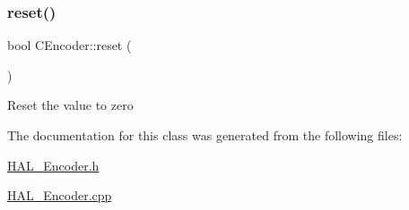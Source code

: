 \mbox{\label{class_c_encoder_a75c1bf0e999ea2c93937e487ab89f4a8}} 
\subsubsection{\texorpdfstring{reset()}{reset()}}
{\footnotesize\ttfamily bool C\+Encoder\+::reset (\begin{DoxyParamCaption}{ }\end{DoxyParamCaption})}

Reset the value to zero 

The documentation for this class was generated from the following files\+:\begin{DoxyCompactItemize}
\item 
\mbox{\hyperlink{_h_a_l___encoder_8h}{H\+A\+L\+\_\+\+Encoder.\+h}}\item 
\mbox{\hyperlink{_h_a_l___encoder_8cpp}{H\+A\+L\+\_\+\+Encoder.\+cpp}}\end{DoxyCompactItemize}
